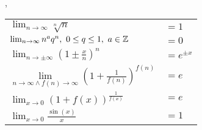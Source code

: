 \sep
\begin{table}[H]
\centering
\begin{tabular}{p{4.5cm}p{1cm}}
$\lim_{n \rightarrow \infty} \sqrt[n]{n}$ & $=1$
\\
$\lim_{n \rightarrow \infty} n^{a}q^{n}, \ 0 \leq q \leq 1, \ a \in \mathbb{Z}$ & $=0$
\\
\midrule
$\lim _{n \rightarrow \pm \infty}\left(1 \pm \frac{x}{n}\right)^{n}$&$=e^{\pm x}$
\\
$\lim \limits_{n \rightarrow \infty \land f(n) \rightarrow \infty}\left(1+\frac{1}{f(n)}\right)^{f(n)}$ & $=e$
\\
$\lim _{x \rightarrow 0}(1+f(x))^{\frac{1}{f(x)}}$ & $=e$
\\
\midrule
$\lim _{x \rightarrow 0} \frac{\sin (x)}{x}$&$=1$
\end{tabular}
\end{table}